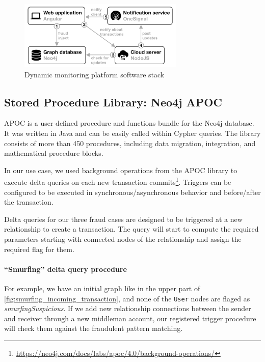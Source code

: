 \begin{figure}[!ht]
  \centering
  \includegraphics[width=0.7\textwidth]{figures/software_stack.png}
  \caption{Dynamic monitoring platform software stack} 
  \label{fig:software_stack}
\end{figure}

\subsection{Stored Procedure Library: Neo4j APOC}

APOC is a user-defined procedure and functions bundle for the Neo4j database.
It was written in Java and can be easily called within Cypher queries.
The library consists of more than 450 procedures, including data migration, integration, and mathematical procedure blocks.

In our use case, we used background operations from the APOC library to execute delta queries on each new transaction commits\footnote{\url{https://neo4j.com/docs/labs/apoc/4.0/background-operations/}}.
Triggers can be configured to be executed in synchronous/asynchronous behavior and before/after the transaction.

Delta queries for our three fraud cases are designed to be triggered at a new relationship to create a transaction.
The query will start to compute the required parameters starting with connected nodes of the relationship and assign the required flag for them.

\paragraph{``Smurfing'' delta query procedure}

For example, we have an initial graph like in the upper part of \autoref{fig:smurfing_incoming_transaction}, and none of the \texttt{User} nodes are flaged as \textit{smurfingSuspicious}.
If we add new relationship connections between the sender and receiver through a new middleman account, our registered trigger procedure will check them against the fraudulent pattern matching.

